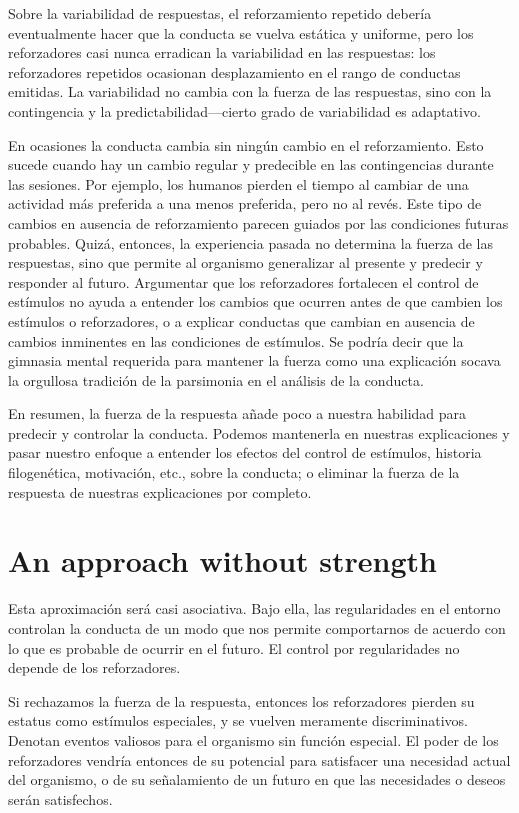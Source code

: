 \documentclass[a4paper,12pt]{article}
\begin{document}
Sobre la variabilidad de respuestas, el reforzamiento repetido debería eventualmente hacer que la conducta se vuelva estática y uniforme, pero los reforzadores casi nunca erradican la variabilidad en las respuestas: los reforzadores repetidos ocasionan desplazamiento en el rango de conductas emitidas. La variabilidad no cambia con la fuerza de las respuestas, sino con la contingencia y la predictabilidad---cierto grado de variabilidad es adaptativo.

En ocasiones la conducta cambia sin ningún cambio en el reforzamiento. Esto sucede cuando hay un cambio regular y predecible en las contingencias durante las sesiones. Por ejemplo, los humanos pierden el tiempo al cambiar de una actividad más preferida a una menos preferida, pero no al revés. Este tipo de cambios en ausencia de reforzamiento parecen guiados por las condiciones futuras probables. Quizá, entonces, la experiencia pasada no determina la fuerza de las respuestas, sino que permite al organismo generalizar al presente y predecir y responder al futuro. Argumentar que los reforzadores fortalecen el control de estímulos no ayuda a entender los cambios que ocurren antes de que cambien los estímulos o reforzadores, o a explicar conductas que cambian en ausencia de cambios inminentes en las condiciones de estímulos. Se podría decir que la gimnasia mental requerida para mantener la fuerza como una explicación socava la orgullosa tradición de la parsimonia en el análisis de la conducta.

En resumen, la fuerza de la respuesta añade poco a nuestra habilidad para predecir y controlar la conducta. Podemos mantenerla en nuestras explicaciones y pasar nuestro enfoque a entender los efectos del control de estímulos, historia filogenética, motivación, etc., sobre la conducta; o eliminar la fuerza de la respuesta de nuestras explicaciones por completo.

\section{An approach without strength}

Esta aproximación será casi asociativa. Bajo ella, las regularidades en el entorno controlan la conducta de un modo que nos permite comportarnos de acuerdo con lo que es probable de ocurrir en el futuro. El control por regularidades no depende de los reforzadores.

Si rechazamos la fuerza de la respuesta, entonces los reforzadores pierden su estatus como estímulos especiales, y se vuelven meramente discriminativos. Denotan eventos valiosos para el organismo sin función especial. El poder de los reforzadores vendría entonces de su potencial para satisfacer una necesidad actual del organismo, o de su señalamiento de un futuro en que las necesidades o deseos serán satisfechos.
\end{document}
